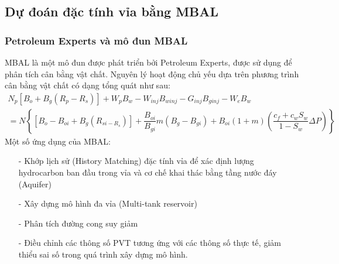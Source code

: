 \documentclass[12pt,a4paper]{report}
\begin{document}
\subsection{Dự đoán đặc tính vỉa bằng MBAL}
	\subsubsection{Petroleum Experts và mô đun MBAL}
    MBAL là một mô đun được phát triển bởi Petroleum Experts, được sử dụng để phân tích cân bằng vật chất. Nguyên lý hoạt động chủ yếu dựa trên phương trình cân bằng vật chất có dạng tổng quát như sau:
    \begin{multline*}
    	N_p[B_o+B_g(R_p-R_s)]+W_pB_w-W_{inj}B_{winj}-G_{inj}B_{ginj}-W_eB_w\\
        = N\left\{[B_o-B_{oi}+B_g(R_{si-R_s})]+\dfrac{B_{oi}}{B_{gi}}m(B_g-B_{gi})+B_{oi}(1+m)\left(\dfrac{c_f+c_wS_w}{1-S_w}\Delta 	P\right)\right\}
	\end{multline*}
    Một số ứng dụng của MBAL:
    \begin{itemize}
    	\item[-] Khớp lịch sử (History Matching) đặc tính vỉa để xác định lượng hydrocarbon ban đầu trong vỉa và cơ chế khai thác bằng tầng nước đáy (Aquifer)
        \item[-] Xây dựng mô hình đa vỉa (Multi-tank reservoir)
        \item[-] Phân tích đường cong suy giảm
        \item[-] Điều chỉnh các thông số PVT tương ứng với các thông số thực tế, giảm thiểu sai số trong quá trình xây dựng mô hình.
    \end{itemize}
    \newpage
\end{document}
